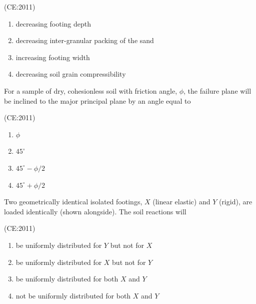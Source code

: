     \hfill{(CE:2011)}
        \begin{enumerate}
            \item decreasing footing depth
            \item decreasing inter-granular packing of the sand
            \item increasing footing width
            \item decreasing soil grain compressibility
        \end{enumerate}
\vspace{1cm}
    \item For a sample of dry, cohesionless soil with friction angle, $\phi$, the failure plane will be inclined to the major principal plane by an angle equal to

    \hfill{(CE:2011)}
    \begin{multicols}{4}
        \begin{enumerate}
            \item $\phi$
            \item $45^\circ$
            \item $45^\circ - \phi / 2$
            \item $45^\circ + \phi / 2$
        \end{enumerate}
    \end{multicols}
\vspace{1cm}
    \item Two geometrically identical isolated footings, $X$ (linear elastic) and $Y$ (rigid), are loaded identically (shown alongside). The soil reactions will
	    \newpage
	    \begin{center}
	    
	    \end{center}
    \hfill{(CE:2011)}
    \begin{multicols}{2}
        \begin{enumerate}
            \item be uniformly distributed for $Y$ but not for $X$
            \item be uniformly distributed for $X$ but not for $Y$
            \item be uniformly distributed for both $X$ and $Y$
            \item not be uniformly distributed for both $X$ and $Y$
        \end{enumerate}
    \end{multicols}


